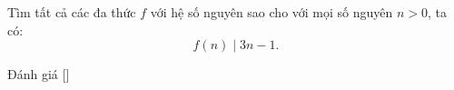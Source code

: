 \ifshowproblem
\begin{problem}\label{problem:FRA-2015-TST4-P1}
    Tìm tất cả các đa thức \( f \) với hệ số nguyên sao cho với mọi số nguyên \( n > 0 \), ta có:
    \[
        f(n) \mid 3n - 1.
    \]
\end{problem}
\fi

\ifshowinfo
Đánh giá [\textbf{}]
\fi